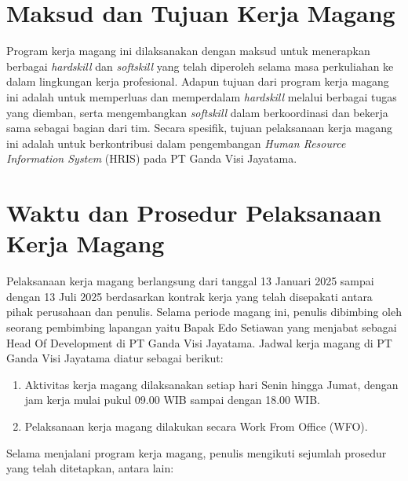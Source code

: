 \section{Maksud dan Tujuan Kerja Magang}
Program kerja magang ini dilaksanakan dengan maksud untuk menerapkan berbagai 
\textit{hardskill} dan \textit{softskill} yang telah diperoleh selama masa 
perkuliahan ke dalam lingkungan kerja profesional. Adapun tujuan dari program 
kerja magang ini adalah untuk memperluas dan memperdalam \textit{hardskill} 
melalui berbagai tugas yang diemban, serta mengembangkan \textit{softskill} 
dalam berkoordinasi dan bekerja sama sebagai bagian dari tim. Secara spesifik, 
tujuan pelaksanaan kerja magang ini adalah untuk berkontribusi dalam 
pengembangan \textit{Human Resource Information System} (HRIS) pada 
PT Ganda Visi Jayatama.



\section{Waktu dan Prosedur Pelaksanaan Kerja Magang}

Pelaksanaan kerja magang berlangsung dari tanggal 13 Januari 2025 sampai dengan 
13 Juli 2025 berdasarkan kontrak kerja yang telah disepakati antara pihak 
perusahaan dan penulis. Selama periode magang ini, penulis dibimbing oleh 
seorang pembimbing lapangan yaitu Bapak Edo Setiawan yang 
menjabat sebagai Head Of Development di PT Ganda Visi Jayatama. Jadwal 
kerja magang di PT Ganda Visi Jayatama diatur sebagai berikut:

\begin{enumerate}
    \item Aktivitas kerja magang dilaksanakan setiap hari Senin hingga Jumat, 
    dengan jam kerja mulai pukul 09.00 WIB sampai dengan 18.00 WIB.
    \item Pelaksanaan kerja magang dilakukan secara Work From Office (WFO).
\end{enumerate}

Selama menjalani program kerja magang, penulis mengikuti sejumlah prosedur 
yang telah ditetapkan, antara lain:

